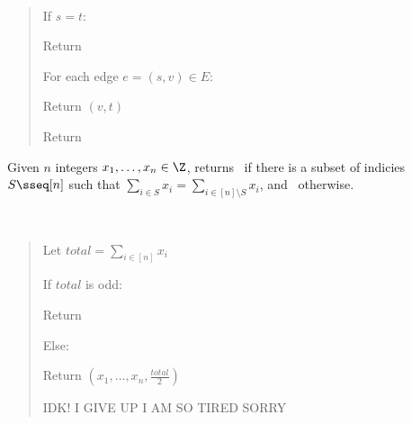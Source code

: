 \documentclass[10pt]{article}
\begin{document}
\begin{solution}\ %
\begin{quote}%
\noindent{}%

%

\begin{steps}
  \item If \( s = t \):
    \begin{steps}
    \item Return \boolT~
    \end{steps}
  \end{steps}
  \begin{steps}
  \setcounter{stepsi}{1}
  \item For each edge \( e = (s, v) \in E \):
    \begin{steps}
    \item Return \( (v, t) \)
    \end{steps}
  \item Return \boolF~
\end{steps}

\end{quote}%
\end{solution}%
\pagebreak

Given \( n \) integers \( x_1,\ldots,x_n\in\Z \), returns \boolT~if there is a subset of indicies \( S\sseq [n] \) such that \( \sum_{i\in S}x_i = \sum_{i\in[n]\setminus S} x_i \), and \boolF~otherwise.

\begin{solution}\ %
\begin{quote}%
\noindent{}%

%

\begin{steps}
  \item Let \( total = \sum_{i\in [n]} x_i \)
  \item If \( total \) is odd:
    \begin{steps}
    \item Return \boolF
    \end{steps}
  \item Else: 
    \begin{steps}
    \item Return \( (x_1,\ldots,x_n, \frac{total}{2}) \)
    \end{steps}

  \item IDK! I GIVE UP I AM SO TIRED SORRY
\end{steps}

\end{quote}%
\end{solution}%
\end{document}
